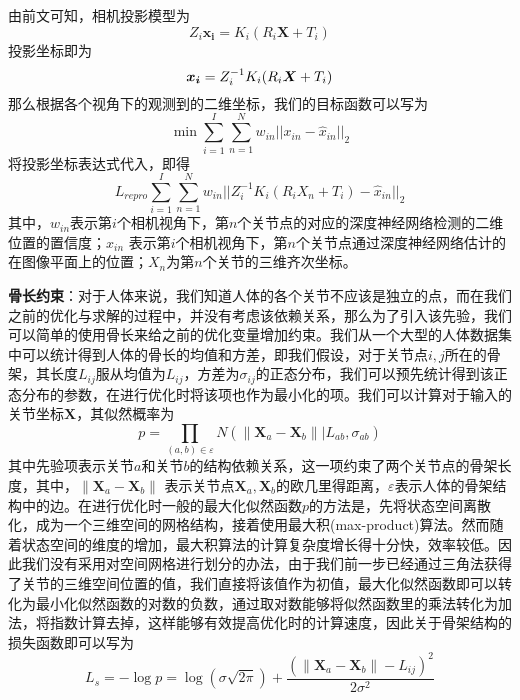 由前文可知，相机投影模型为
\begin{equation}
    Z_i \bm{x_i} = K_i(R_i\bm{X} + T_i)
\end{equation}
投影坐标即为
\begin{equation}
    \bm{x_i} = Z_i^{-1}K_i(R_i{\bm{X}} + T_i)
\end{equation}
那么根据各个视角下的观测到的二维坐标，我们的目标函数可以写为
\begin{equation}
    \min \sum^I_{i=1} \sum_{n=1}^N w_{in}||x_{in} - \hat x_{in}||_2
\end{equation}
将投影坐标表达式代入，即得
\begin{equation}
    L_{repro} \sum^I_{i=1} \sum_{n=1}^N w_{in}||Z_i^{-1}K_i(R_iX_n + T_i) - \hat x_{in}||_2
\end{equation}
\newcommand{\mi}{第\(i\)个}
\newcommand{\mn}{第\(n\)个}
其中，$w_{in}$表示\mi 相机视角下，\mn 关节点的对应的深度神经网络检测的二维位置的置信度；$\hat x_{in}$ 表示\mi 相机视角下，\mn 关节点通过深度神经网络估计的在图像平面上的位置；$X_n$为\mn 关节的三维齐次坐标。

\textbf{骨长约束}：对于人体来说，我们知道人体的各个关节不应该是独立的点，而在我们之前的优化与求解的过程中，并没有考虑该依赖关系，那么为了引入该先验，我们可以简单的使用骨长来给之前的优化变量增加约束。我们从一个大型的人体数据集中可以统计得到人体的骨长的均值和方差，即我们假设，对于关节点\(i,j\)所在的骨架，其长度\(L_{ij}\)服从均值为\(L_{ij}\)，方差为\(\sigma_{ij}\)的正态分布，我们可以预先统计得到该正态分布的参数，在进行优化时将该项也作为最小化的项。我们可以计算对于输入的关节坐标\(\bm{X}\)，其似然概率为
\begin{equation}
    p  = \prod _ { ( a,b ) \in \varepsilon } N \left( \left\| \boldsymbol {X} _ { a } - \boldsymbol {X} _ { b } \right\| | L _ {ab} , \sigma _ {ab} \right)
\end{equation}
其中先验项表示关节\(a\)和关节\(b\)的结构依赖关系，这一项约束了两个关节点的骨架长度，其中，\(\left\| \boldsymbol {X} _ { a } - \boldsymbol {X} _ { b } \right\|\) 表示关节点\(\boldsymbol {X} _ { a }, \boldsymbol {X} _ { b } \)的欧几里得距离，\(\varepsilon\)表示人体的骨架结构中的边。在进行优化时一般的最大化似然函数\(p\)的方法是，先将状态空间离散化，成为一个三维空间的网格结构，接着使用最大积(max-product)算法\cite{max-product}。然而随着状态空间的维度的增加，最大积算法的计算复杂度增长得十分快，效率较低。因此我们没有采用对空间网格进行划分的办法，由于我们前一步已经通过三角法获得了关节的三维空间位置的值，我们直接将该值作为初值，最大化似然函数即可以转化为最小化似然函数的对数的负数，通过取对数能够将似然函数里的乘法转化为加法，将指数计算去掉，这样能够有效提高优化时的计算速度，因此关于骨架结构的损失函数即可以写为
\begin{equation}
    L_{s} = -\log p = \log (\sigma \sqrt{2\pi}) + \frac{(\left\| \boldsymbol {X} _ { a } - \boldsymbol {X} _ { b } \right\| - L_{ij})^2}{2\sigma^2}
\end{equation}

